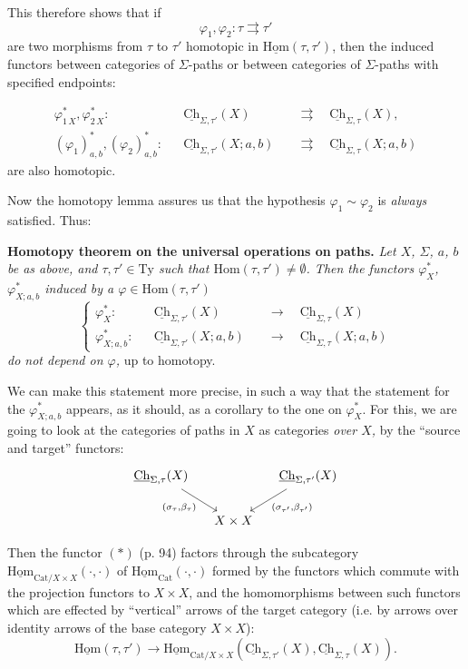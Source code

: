 \documentclass[11pt]{article}
\newcommand{\printedpage}[1]{\marginpar{\footnotesize p.~#1}}
\newcommand{\msp}[1]{\marginpar{\footnotesize [#1]}}
\newcommand{\uHom}{\underline{\mathrm{Hom}}}
\newcommand{\uCh}{\underline{\mathrm{Ch}}}
\begin{document}
This therefore shows that if
\[
\varphi_1,\varphi_2:\tau\rightrightarrows\tau'
\]
are two morphisms from $\tau$ to $\tau'$ homotopic in $\uHom(\tau,\tau')$, then the induced functors between categories of $\Sigma$-paths or between categories of $\Sigma$-paths with specified endpoints: %

\msp{page 97}
\[
\begin{aligned}
\varphi^*_{1\,X},\varphi^*_{2\,X} : && \uCh_{\Sigma,\tau'}(X) &\quad\rightrightarrows\quad\uCh_{\Sigma,\tau}(X),\\
(\varphi_1)^*_{a,b},(\varphi_2)^*_{a,b} : && \uCh_{\Sigma,\tau'}(X;a,b) &\quad\rightrightarrows\quad\uCh_{\Sigma,\tau}(X;a,b)
\end{aligned}
\]
are also homotopic.

Now the homotopy lemma assures us that the hypothesis $\varphi_1\sim\varphi_2$ is \textit{always} satisfied. Thus:

\textbf{Homotopy theorem on the universal operations on paths.} \textit{Let $X$, $\Sigma$, $a$, $b$ be as above, and $\tau,\tau'\in\mathrm{Ty}$ such that $\mathrm{Hom}(\tau,\tau')\neq\emptyset$. Then the functors $\varphi^*_X$, $\varphi^*_{X;a,b}$ induced by a $\varphi\in\mathrm{Hom}(\tau,\tau')$}
\[
\left\{
\begin{aligned}
\varphi^*_X : && \uCh_{\Sigma,\tau'}(X) &\quad\longrightarrow\quad\uCh_{\Sigma,\tau}(X)\\
\varphi^*_{X;a,b} : && \uCh_{\Sigma,\tau'}(X;a,b) &\quad\longrightarrow\quad\uCh_{\Sigma,\tau}(X;a,b)
\end{aligned}
\right.
\]
\textit{do not depend on $\varphi$,} up to homotopy.

We can make this statement more precise, in such a way that the statement for the $\varphi^*_{X;a,b}$ appears, as it should, as a corollary to the one on $\varphi^*_X$. For this, we are going to look at the categories of paths in $X$ as categories \textit{over $X$,} by the ``source and target'' functors:
\[
\begin{tikzcd}[column sep=small]
\uCh_{\Sigma,\tau}(X) \arrow[dr, "(\sigma_\tau{,}\beta_\tau)"'] & & \uCh_{\Sigma,\tau'}(X) \arrow[dl, "(\sigma_{\tau'}{,}\beta_{\tau'})"]\\
 & X\times X &
\end{tikzcd}
\]

\newpage
\printedpage{63}

\msp{page 98}

Then the functor $(*)$ (p. 94) factors through the subcategory $\uHom_{\mathrm{Cat}/X\times X}(\cdot,\cdot)$ of $\uHom_{\mathrm{Cat}}(\cdot,\cdot)$ formed by the functors which commute with the projection functors to $X\times X$, and the homomorphisms between such functors which are effected by ``vertical'' arrows of the target category (i.e. by arrows over identity arrows of the base category $X\times X$):
\[
\uHom(\tau,\tau')\longrightarrow\uHom_{\mathrm{Cat}/X\times X}(\uCh_{\Sigma,\tau'}(X),\uCh_{\Sigma,\tau}(X)).
\]
\end{document}
